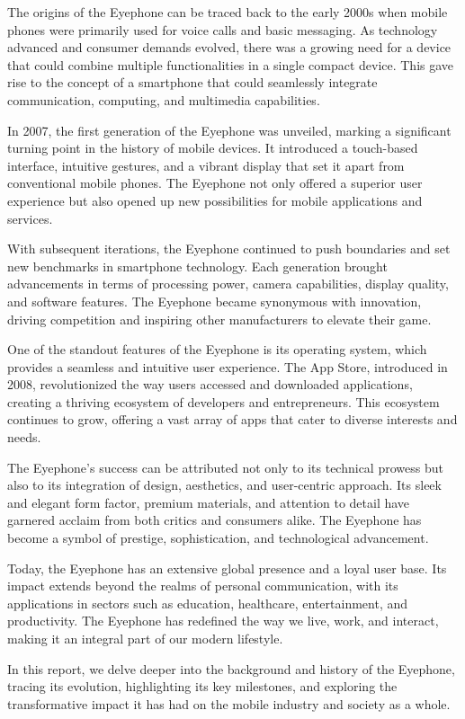 \documentclass[a4paper,11pt]{report}
\begin{document}
The origins of the Eyephone can be traced back to the early 2000s when mobile phones were primarily used for voice calls and basic messaging. As technology advanced and consumer demands evolved, there was a growing need for a device that could combine multiple functionalities in a single compact device. This gave rise to the concept of a smartphone that could seamlessly integrate communication, computing, and multimedia capabilities.

In 2007, the first generation of the Eyephone was unveiled, marking a significant turning point in the history of mobile devices. It introduced a touch-based interface, intuitive gestures, and a vibrant display that set it apart from conventional mobile phones. The Eyephone not only offered a superior user experience but also opened up new possibilities for mobile applications and services.

With subsequent iterations, the Eyephone continued to push boundaries and set new benchmarks in smartphone technology. Each generation brought advancements in terms of processing power, camera capabilities, display quality, and software features. The Eyephone became synonymous with innovation, driving competition and inspiring other manufacturers to elevate their game.

One of the standout features of the Eyephone is its operating system, which provides a seamless and intuitive user experience. The App Store, introduced in 2008, revolutionized the way users accessed and downloaded applications, creating a thriving ecosystem of developers and entrepreneurs. This ecosystem continues to grow, offering a vast array of apps that cater to diverse interests and needs.

The Eyephone's success can be attributed not only to its technical prowess but also to its integration of design, aesthetics, and user-centric approach. Its sleek and elegant form factor, premium materials, and attention to detail have garnered acclaim from both critics and consumers alike. The Eyephone has become a symbol of prestige, sophistication, and technological advancement.

Today, the Eyephone has an extensive global presence and a loyal user base. Its impact extends beyond the realms of personal communication, with its applications in sectors such as education, healthcare, entertainment, and productivity. The Eyephone has redefined the way we live, work, and interact, making it an integral part of our modern lifestyle.

In this report, we delve deeper into the background and history of the Eyephone, tracing its evolution, highlighting its key milestones, and exploring the transformative impact it has had on the mobile industry and society as a whole.
\end{document}
